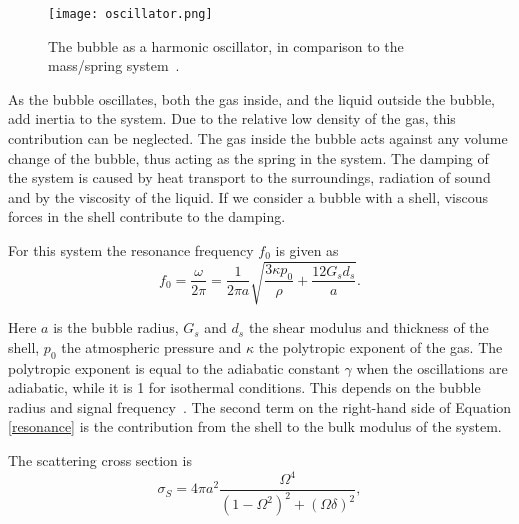 \begin{figure}[h]
  \centering
  \texttt{[image: oscillator.png]}
  \caption{The bubble as a harmonic oscillator, in comparison to the mass/spring system~\cite{Hoff2000}.}
  \label{Fig:oscillator}
\end{figure} 

As the bubble oscillates, both the gas inside, and the liquid outside the bubble, add inertia to the system. Due to the relative low density of the gas, this contribution can be neglected. The gas inside the bubble acts against any volume change of the bubble, thus acting as the spring in the system. The damping of the system is caused by heat transport to the surroundings, radiation of sound and by the viscosity of the liquid. If we consider a bubble with a shell, viscous forces in the shell contribute to the damping. 

%
%

For this system the resonance frequency $f_0$ is given as ~\cite{Hoff2000}
\begin{equation}
\label{resonance}
f_0 = \frac{\omega}{2 \pi}= \frac{1}{2 \pi a} \sqrt{\frac{3\kappa p_0}{\rho}+ \frac{12 G_s d_s}{a}}.
\end{equation} 

Here $a$ is the bubble radius, $G_s$ and $d_s$ the shear modulus and thickness of the shell, $p_0$ the atmospheric pressure and $\kappa$ the polytropic exponent of the gas. The polytropic exponent is equal to the adiabatic constant $\gamma$ when the oscillations are adiabatic, while it is 1 for isothermal conditions. This depends on the bubble radius and signal frequency~\cite{Hoff2000}. The second term on the right-hand side of Equation \eqref{resonance} is the contribution from the shell to the bulk modulus of the system. 

The scattering cross section is 
\begin{equation}
\label{eq:cross section}
\sigma_S = 4\pi a^2 \frac{\Omega^4}{(1-\Omega^2)^2 + (\Omega \delta)^2}, 
\end{equation}

